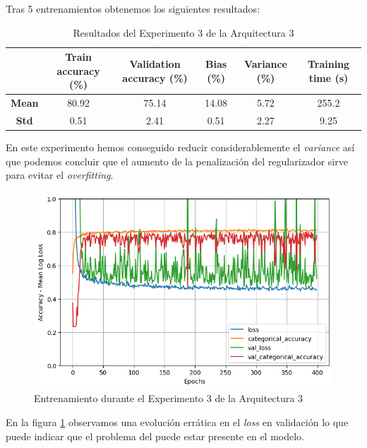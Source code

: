 \documentclass{article}
\begin{document}
			Tras 5 entrenamientos obtenemos los siguientes resultados:
			\begin{table}[!h]
				\begin{center}
					\begin{tabular}{ c | c | c | c | c | c |}
						\ & \textbf{Train accuracy (\%)} & \textbf{Validation accuracy (\%)} & \textbf{Bias (\%)} & \textbf{Variance (\%)} & \textbf{Training time (s)} \\ \hline
						\textbf{Mean} & 80.92 & 75.14 & 14.08 & 5.72 & 255.2 \\ \hline
						\textbf{Std} & 0.51 & 2.41 & 0.51 & 2.27 & 9.25 \\ \hline
					\end{tabular}
					\caption{Resultados del Experimento 3 de la Arquitectura 3}
					\label{tab:res-d-a3-e3}
				\end{center}
			\end{table}
			
			En este experimento hemos conseguido reducir considerablemente el \textit{variance} as\'i que podemos concluir que el aumento de la penalizaci\'on del regularizador sirve para evitar el \textit{overfitting}.
			\begin{figure}[!h]
				\begin{center}
					\includegraphics[scale=0.5]{d-tr-a3-e3.png}		
					\caption{Entrenamiento durante el Experimento 3 de la Arquitectura 3}	
					\label{d-tr-a3-e3}
				\end{center}
			\end{figure}
			En la figura \ref{d-tr-a3-e3} observamos una evoluci\'on err\'atica en el \textit{loss} en validaci\'on lo que puede indicar que el problema del  puede estar presente en el modelo.
			
\end{document}
